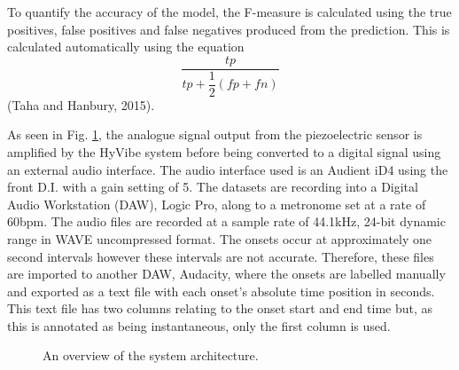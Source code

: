\documentclass[conference]{IEEEtran}
\begin{document}
To quantify the accuracy of the model, the F-measure is calculated using the true positives, false positives and false negatives produced from the prediction. This is calculated automatically using the equation \[\dfrac{tp}{tp+\dfrac{1}{2}(fp+fn)}\] (Taha and Hanbury, 2015).

As seen in Fig. \ref{system}, the analogue signal output from the piezoelectric sensor is amplified by the HyVibe system before being converted to a digital signal using an external audio interface. The audio interface used is an Audient iD4 using the front D.I. with a gain setting of 5. The datasets are recording into a Digital Audio Workstation (DAW), Logic Pro, along to
a metronome set at a rate of 60bpm. The audio files are recorded at a sample rate of 44.1kHz, 24-bit dynamic range in WAVE uncompressed format. The onsets occur at approximately one second intervals however these intervals are not accurate. Therefore, these files are imported 
to another DAW, Audacity, where the onsets are labelled manually and exported as a text file with each onset's absolute time position in seconds. This text file has two columns relating to the onset start and end time but, as this is annotated as being instantaneous, only the first column is used.

\begin{figure}[htbp]
    \caption{An overview of the system architecture.}
    \label{system}
    \end{figure}
\end{document}
